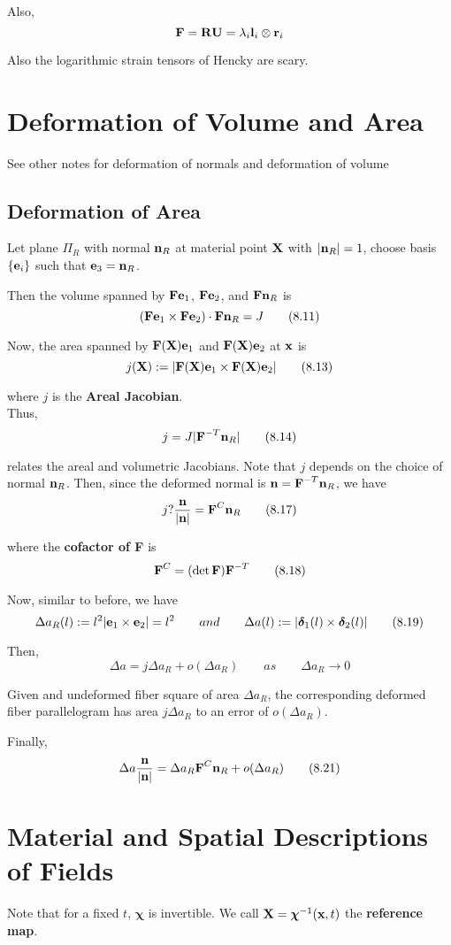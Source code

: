 \documentclass{article}
\newcommand{\Chi}{\boldsymbol{\chi}}
\begin{document}
Also,
\[
	\textbf{F} = \textbf{R}\textbf{U} = \lambda_i\textbf{l}_i\otimes\textbf{r}_i 
\]

Also the logarithmic strain tensors of Hencky are scary.

\section{Deformation of Volume and Area}
See other notes for deformation of normals and deformation of volume
\subsection{Deformation of Area}

Let plane $\Pi_R$ with normal $\textbf{n}_R$ at material point $\textbf{X}$ with $|\textbf{n}_R| = 1$, choose basis $\lbrace \textbf{e}_i \rbrace$ such that $\textbf{e}_3 = \textbf{n}_R$.

Then the volume spanned by $\textbf{F}\textbf{e}_1$, $\textbf{F}\textbf{e}_2$, and $\textbf{F}\textbf{n}_R$ is
\[
	(\textbf{F}\textbf{e}_1\times\textbf{F}\textbf{e}_2)\cdot\textbf{F}\textbf{n}_R = J \tag{8.11}\label{eq:8.11}
\]

Now, the area spanned by $\textbf{F}(\textbf{X})\textbf{e}_1$ and $\textbf{F}(\textbf{X})\textbf{e}_2$ at $\textbf{x}$ is
\[
	j(\textbf{X}):= |\textbf{F}(\textbf{X})\textbf{e}_1\times\textbf{F}(\textbf{X})\textbf{e}_2|\tag{8.13}\label{eq:8.13}	 
\]

where $j$ is the \textbf{Areal Jacobian}.\\

Thus,
\[
	j = J|\textbf{F}^{-T}\textbf{n}_R|\tag{8.14}\label{eq:8.14}
\]

relates the areal and volumetric Jacobians. Note that $j$ depends on the choice of normal $\textbf{n}_R$.
Then, since the deformed normal is $\textbf{n} = \textbf{F}^{-T}\textbf{n}_R$, we have
\[
	j?\frac{\textbf{n}}{|\textbf{n}|}=\textbf{F}^C\textbf{n}_R\tag{8.17}\label{eq:8.17}
\]

where the \textbf{cofactor of F} is
\[
	\textbf{F}^C = (\det\textbf{F})\textbf{F}^{-T}\tag{8.18}\label{eq:8.18}
\]

Now, similar to before, we have
\[
	\Delta a_R(l) := l^2|\textbf{e}_1\times\textbf{e}_2| = l^2 \qquad and \qquad \Delta a(l) := |\boldsymbol{\delta}_1(l)\times\boldsymbol{\delta}_2(l)| \tag{8.19} 
\]

Then,
\[
	\Delta a = j\Delta a_R + o(\Delta a_R) \qquad as \qquad \Delta a_R \to 0\tag{8.20}
\]
\begin{remark}
	Given and undeformed fiber square of area $\Delta a_R$, the corresponding deformed fiber parallelogram has area $j\Delta a_R$ to an error of $o(\Delta a_R)$.
\end{remark}
Finally,
\[
	\Delta a\frac{\textbf{n}}{|\textbf{n}|} = \Delta a_R\textbf{F}^C\textbf{n}_R + o(\Delta a_R)\tag{8.21}
\]


\section{Material and Spatial Descriptions of Fields}
Note that for a fixed $t$, $\Chi$ is invertible. We call $\X = \Chi^{-1}(\x,t)$ the \textbf{reference map}.\\
\end{document}

